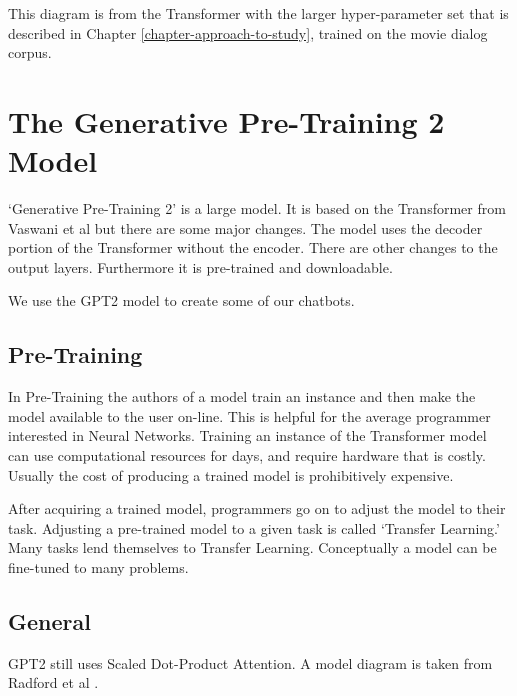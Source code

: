 This diagram is from the Transformer with the larger hyper-parameter set that is described in Chapter \ref{chapter-approach-to-study}, trained on the movie dialog corpus.


\section{The Generative Pre-Training 2 Model}

\label{pre-trining-2-model}

`Generative Pre-Training 2' is a large model. It is based on the Transformer from Vaswani et al \cite{Vaswani2017AttentionIA} but there are some major changes. The model uses the decoder portion of the Transformer without the encoder. There are other changes to the output layers. Furthermore it is pre-trained and downloadable.

We use the GPT2 model to create some of our chatbots.


\subsection{Pre-Training}
In Pre-Training the authors of a model train an instance and then make the model available to the user on-line. This is helpful for the average programmer interested in Neural Networks. Training an instance of the Transformer model can use computational resources for days, and require hardware that is costly. Usually the cost of producing a trained model is prohibitively expensive.

After acquiring a trained model, programmers go on to adjust the model to their task. Adjusting a pre-trained model to a given task is called `Transfer Learning.' Many tasks lend themselves to Transfer Learning. Conceptually a model can be fine-tuned to many problems. %


\subsection{General}
\ac{GPT2} still uses Scaled Dot-Product Attention. A model diagram is taken from Radford et al \cite{radford2018improving}. 

